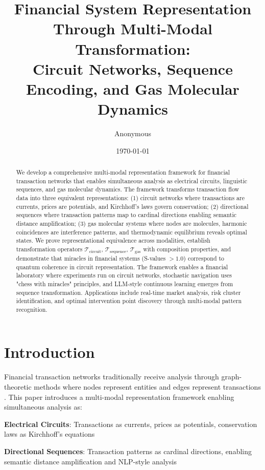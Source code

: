 \documentclass[12pt]{article}
\title{Financial System Representation Through Multi-Modal Transformation:\\
Circuit Networks, Sequence Encoding, and Gas Molecular Dynamics}
\author{Anonymous}
\date{\today}
\begin{document}
\maketitle

\begin{abstract}
We develop a comprehensive multi-modal representation framework for financial transaction networks that enables simultaneous analysis as electrical circuits, linguistic sequences, and gas molecular dynamics. The framework transforms transaction flow data into three equivalent representations: (1) circuit networks where transactions are currents, prices are potentials, and Kirchhoff's laws govern conservation; (2) directional sequences where transaction patterns map to cardinal directions enabling semantic distance amplification; (3) gas molecular systems where nodes are molecules, harmonic coincidences are interference patterns, and thermodynamic equilibrium reveals optimal states. We prove representational equivalence across modalities, establish transformation operators $\mathcal{T}_{\text{circuit}}$, $\mathcal{T}_{\text{sequence}}$, $\mathcal{T}_{\text{gas}}$ with composition properties, and demonstrate that miracles in financial systems (S-values $> 1.0$) correspond to quantum coherence in circuit representation. The framework enables a financial laboratory where experiments run on circuit networks, stochastic navigation uses "chess with miracles" principles, and LLM-style continuous learning emerges from sequence transformation. Applications include real-time market analysis, risk cluster identification, and optimal intervention point discovery through multi-modal pattern recognition.
\end{abstract}

\section{Introduction}

Financial transaction networks traditionally receive analysis through graph-theoretic methods where nodes represent entities and edges represent transactions \cite{newman2003structure}. This paper introduces a multi-modal representation framework enabling simultaneous analysis as:

\textbf{Electrical Circuits}: Transactions as currents, prices as potentials, conservation laws as Kirchhoff's equations \cite{kirchhoff1845laws}

\textbf{Directional Sequences}: Transaction patterns as cardinal directions, enabling semantic distance amplification and NLP-style analysis \cite{shannon1948mathematical}
\end{document}
